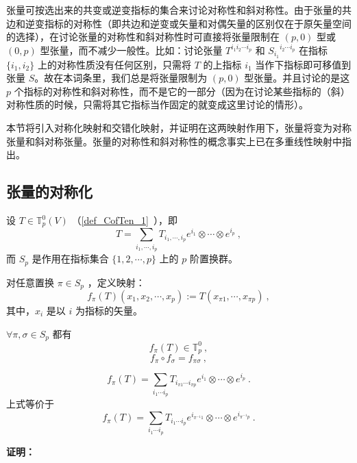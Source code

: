 


张量可按选出来的共变或逆变指标的集合来讨论对称性和斜对称性。由于张量的共边和逆变指标的对称性（即共边和逆变或矢量和对偶矢量的区别仅在于原矢量空间的选择），在讨论张量的对称性和斜对称性时可直接将张量限制在 $(p,0)$ 型或 $(0,p)$ 型张量，而不减少一般性。比如：讨论张量 $T^{i_1 i_2\cdots i_p}$ 和 ${S_{i_1}}^{i_2\cdots i_p}$ 在指标 $\{i_1,i_2\}$ 上的对称性质没有任何区别，只需将 $T$ 的上指标 $i_1$ 当作下指标即可移值到张量 $S$。故在本词条里，我们总是将张量限制为 $(p,0)$ 型张量。并且讨论的是这 $p$ 个指标的对称性和斜对称性，而不是它的一部分（因为在讨论某些指标的（斜）对称性质的时候，只需将其它指标当作固定的就变成这里讨论的情形）。

本节将引入对称化映射和交错化映射，并证明在这两映射作用下，张量将变为对称张量和斜对称张量。张量的对称性和斜对称性的概念事实上已在多重线性映射中指出。
\subsection{张量的对称化}
设 $T\in \mathbb{T}_p^0(V)$ （\autoref{def_CofTen_1}~），即
\begin{equation}
T=\sum_{i_1,\cdots,i_p}T_{i_1,\cdots,i_p}e^{i_1}\otimes\cdots\otimes e^{i_p}~,
\end{equation}
而 $S_p$ 是作用在指标集合 $\{1,2,\cdots,p\}$ 上的 $p$ 阶置换群。

对任意置换 $\pi\in S_p$ ，定义映射：
\begin{equation}\label{eq_SIofTe_1}
f_\pi(T)(x_1,x_2,\cdots,x_p):=T(x_{\pi1},\cdots,x_{\pi p})~,
\end{equation}
其中，$x_i$ 是以 $i$ 为指标的矢量。

\begin{theorem}{}
$\forall \pi,\sigma\in S_p$ 都有 
\begin{equation}
f_{\pi}(T)\in\mathbb{T}_p^0~,
\end{equation}
\begin{equation}\label{eq_SIofTe_6}
f_\pi \circ f_\sigma=f_{\pi\sigma}~,
\end{equation}

\begin{equation}\label{eq_SIofTe_2}
f_{\pi}(T)=\sum_{i_1\cdots i_p}T_{i_{\pi1}\cdots i_{\pi p}}e^{i_1}\otimes\cdots\otimes e^{i_p}~.
\end{equation}
上式等价于
\begin{equation}\label{eq_SIofTe_3}
f_{\pi}(T)=\sum_{i_1\cdots i_p}T_{i_1\cdots i_p}e^{i_{\pi^{-1}1}}\otimes\cdots\otimes e^{i_{\pi^{-1}p}}~.
\end{equation}
\end{theorem}
\textbf{证明：}

